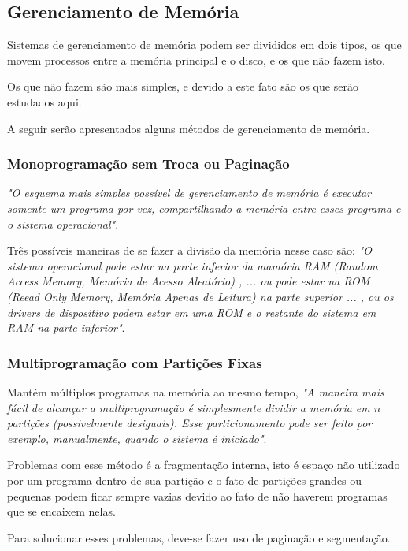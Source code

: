 \subsection{Gerenciamento de Memória}

Sistemas de gerenciamento de memória podem ser divididos em dois tipos, os que movem processos entre a memória principal e o disco, e os que não fazem isto.

Os que não fazem são mais simples, e devido a este fato são os que serão estudados aqui.

A seguir serão apresentados alguns métodos de gerenciamento de memória.

\subsubsection{Monoprogramação sem Troca ou Paginação}

\textit{"O esquema mais simples possível de gerenciamento de memória é executar somente um programa por vez, compartilhando a memória entre esses programa e o sistema operacional"}.  \citep[p.212]{tanenbaum2009sistemas}

Três possíveis maneiras de se fazer a divisão da memória nesse caso são: \textit{"O sistema operacional pode estar na parte inferior da mamória RAM (Random Access Memory, Memória de Acesso Aleatório) , ... ou pode estar na ROM (Reead Only Memory, Memória Apenas de Leitura) na parte superior ... , ou os drivers de dispositivo podem estar em uma ROM e o restante do sistema em RAM na parte inferior"}. \citep[p.212]{tanenbaum2009sistemas}

\subsubsection{Multiprogramação com Partições Fixas}

Mantém múltiplos programas na memória ao mesmo tempo, \textit{"A maneira mais fácil de alcançar a multiprogramação é simplesmente dividir a memória em $n$ partições (possivelmente desiguais). Esse particionamento pode ser feito por exemplo, manualmente, quando o sistema é iniciado"}. \citep[p.212]{tanenbaum2009sistemas}

Problemas com esse método é a fragmentação interna, isto é espaço não utilizado por um programa dentro de sua partição e o fato de partições grandes ou pequenas podem ficar sempre vazias devido ao fato de não haverem programas que se encaixem nelas.

Para solucionar esses problemas, deve-se fazer uso de paginação e segmentação.

